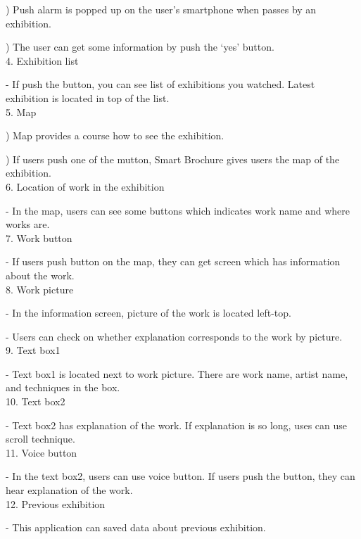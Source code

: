 \documentclass[conference]{IEEEtran}
\begin{document}
) Push alarm is popped up on the user’s smartphone when passes by an exhibition.

) The user can get some information by push the ‘yes’ button.\\

4. Exhibition list 

\quad - If push the button, you can see list of exhibitions you watched. Latest exhibition is located in top of the list.\\

5. Map

) Map provides a course how to see the exhibition.

) If users push one of the mutton, Smart Brochure gives users the map of the exhibition.\\

6. Location of work in the exhibition

\quad - In the map, users can see some buttons which indicates work name and where works are.\\

7. Work button

\quad - If users push button on the map, they can get screen which has information about the work.\\

8. Work picture

\quad - In the information screen, picture of the work is located left-top. 

\quad - Users can check on whether explanation corresponds to the work by picture.\\

9. Text box1

\quad - Text box1 is located next to work picture. There are work name, artist name, and techniques in the box.\\

10. Text box2

\quad - Text box2 has explanation of the work. If explanation is so long, uses can use scroll technique.\\

11. Voice button

\quad - In the text box2, users can use voice button. If users push the button, they can hear explanation of the work.\\

12. Previous exhibition

\quad - This application can saved data about previous exhibition.\\
\end{document}
